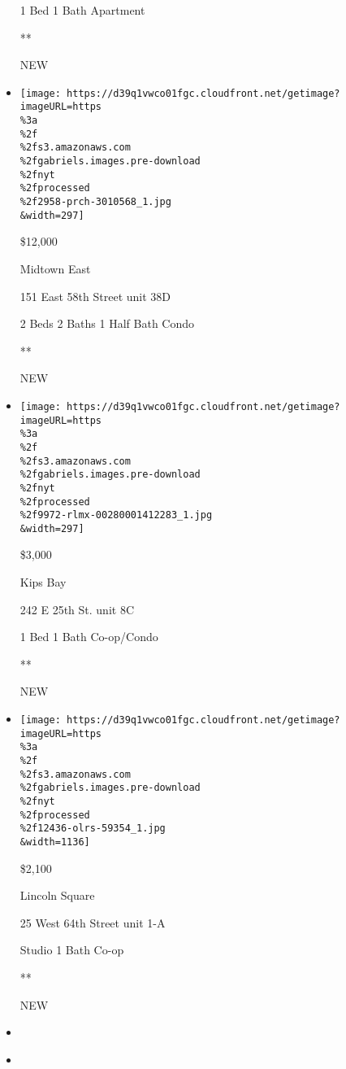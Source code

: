 \begin{itemize}
  1 Bed \textbar{} 1 Bath \textbar{} Apartment

  **

  NEW
\item
  \href{/real-estate/usa/ny/new-york/midtown-east/homes-for-rent/151-east-58th-street/2958-PRCH-3010568?}{}

  \texttt{[image: https://d39q1vwco01fgc.cloudfront.net/getimage?imageURL=https\\\%3a\\\%2f\\\%2fs3.amazonaws.com\\\%2fgabriels.images.pre-download\\\%2fnyt\\\%2fprocessed\\\%2f2958-prch-3010568\_1.jpg\\\&width=297]}

  \$12,000

  Midtown East

  151 East 58th Street unit 38D

  2 Beds \textbar{} 2 Baths \textbar{} 1 Half Bath \textbar{} Condo

  **

  NEW
\item
  \href{/real-estate/usa/ny/new-york/kips-bay/homes-for-rent/242-e-25th-st/9972-RLMX-00280001412283?}{}

  \texttt{[image: https://d39q1vwco01fgc.cloudfront.net/getimage?imageURL=https\\\%3a\\\%2f\\\%2fs3.amazonaws.com\\\%2fgabriels.images.pre-download\\\%2fnyt\\\%2fprocessed\\\%2f9972-rlmx-00280001412283\_1.jpg\\\&width=297]}

  \$3,000

  Kips Bay

  242 E 25th St. unit 8C

  1 Bed \textbar{} 1 Bath \textbar{} Co-op/Condo

  **

  NEW
\item
  \href{/real-estate/usa/ny/new-york/lincoln-square/homes-for-rent/25-west-64th-street/12436-OLRS-59354?}{}

  \texttt{[image: https://d39q1vwco01fgc.cloudfront.net/getimage?imageURL=https\\\%3a\\\%2f\\\%2fs3.amazonaws.com\\\%2fgabriels.images.pre-download\\\%2fnyt\\\%2fprocessed\\\%2f12436-olrs-59354\_1.jpg\\\&width=1136]}

  \$2,100

  Lincoln Square

  25 West 64th Street unit 1-A

  Studio \textbar{} 1 Bath \textbar{} Co-op

  **

  NEW
\item
\item
  \href{/real-estate/usa/ny/brooklyn/homes-for-rent/220-suydam/14596-RLMX-00194001117530?}{}


\end{itemize}
